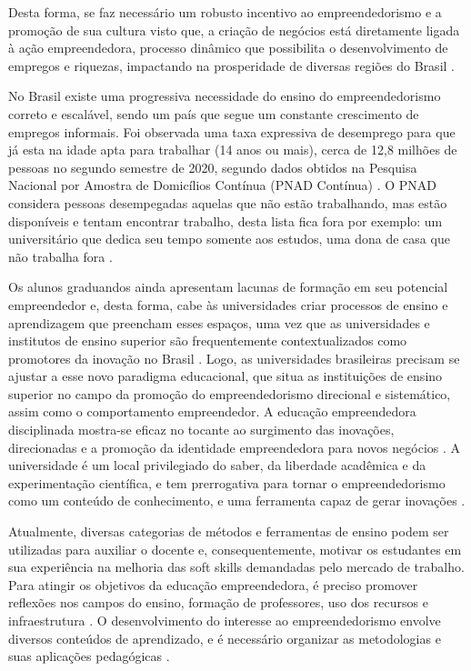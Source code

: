 Desta forma, se faz necessário um robusto incentivo ao empreendedorismo e a promoção de sua cultura visto que, a criação de negócios está diretamente ligada à ação empreendedora, processo dinâmico que possibilita o desenvolvimento de empregos e riquezas, impactando na prosperidade de diversas regiões do Brasil \cite{leite_aprendizagem_2015}.

No Brasil existe uma progressiva necessidade do ensino do empreendedorismo correto e escalável, sendo um país que segue um constante crescimento de empregos informais. Foi observada uma taxa expressiva de desemprego para que já esta na idade apta para trabalhar (14 anos ou mais), cerca de 12,8 milhões de pessoas no segundo semestre de 2020, segundo dados obtidos na Pesquisa Nacional por Amostra de Domicílios Contínua (PNAD Contínua) \cite{ibge_pesquisa_2020}. O PNAD considera pessoas desempegadas aquelas que não estão trabalhando, mas estão disponíveis e tentam encontrar trabalho, desta lista fica fora por exemplo: um universitário que dedica seu tempo somente aos estudos, uma dona de casa que não trabalha fora \cite{ibge_pesquisa_2020}.


Os alunos graduandos ainda apresentam lacunas de formação em seu potencial empreendedor e, desta forma, cabe às universidades criar processos de ensino e aprendizagem que preencham esses espaços, uma vez que as universidades e institutos de ensino superior são frequentemente contextualizados como promotores da inovação no Brasil \cite{pietrovski_alise_2019}. Logo, as universidades brasileiras precisam se ajustar a esse novo paradigma educacional, que situa as instituições de ensino superior no campo da promoção do empreendedorismo direcional e sistemático, assim como o comportamento empreendedor. A educação empreendedora disciplinada mostra-se eficaz no tocante ao surgimento das inovações, direcionadas e a promoção da identidade empreendedora para novos negócios \cite{jain_academics_2009}. A universidade é um local privilegiado do saber, da liberdade acadêmica e da experimentação científica, e tem prerrogativa para tornar o empreendedorismo como um conteúdo de conhecimento, e uma ferramenta capaz de gerar inovações \cite{dolabela_oficina_2008}. 


Atualmente, diversas categorias de métodos e ferramentas de ensino podem ser utilizadas para auxiliar o docente e, consequentemente, motivar os estudantes em sua experiência na melhoria das soft skills demandadas pelo mercado de trabalho. Para atingir os objetivos da educação empreendedora, é preciso promover reflexões nos campos do ensino, formação de professores, uso dos recursos e infraestrutura \cite{marques_experiencia_2019}. O desenvolvimento do interesse ao empreendedorismo envolve diversos conteúdos de aprendizado, e é necessário organizar as metodologias e suas aplicações pedagógicas \cite{rocha_avaliacao_2014}.




